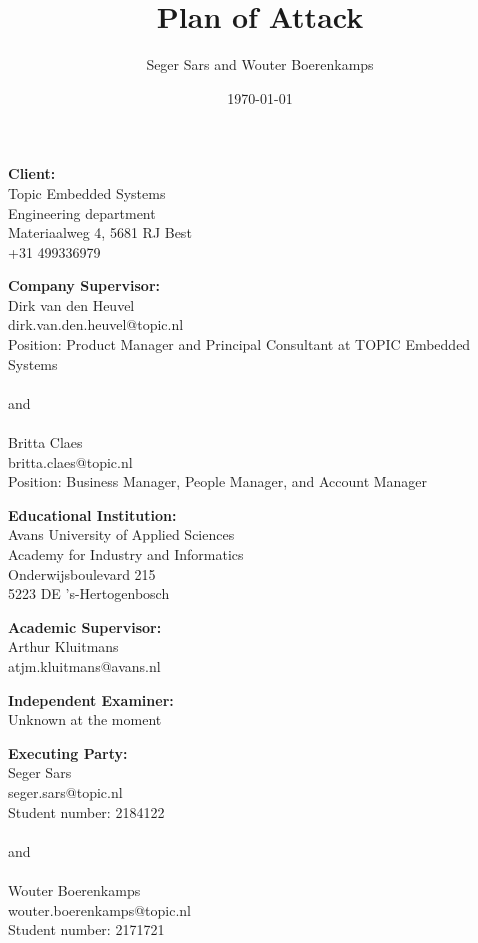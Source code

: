\documentclass{article}
\title{Plan of Attack}
\author{Seger Sars and Wouter Boerenkamps}
\date{\today}
\begin{document}
\maketitle

\newpage

\noindent \textbf{Client:}\\
Topic Embedded Systems\\
Engineering department\\
Materiaalweg 4, 5681 RJ Best\\
+31 499336979\\

\vspace{1em}

\noindent \textbf{Company Supervisor:}\\
Dirk van den Heuvel\\
dirk.van.den.heuvel@topic.nl\\
Position: Product Manager and Principal Consultant at TOPIC Embedded Systems\\
\\
and\\
\\
Britta Claes\\
britta.claes@topic.nl\\
Position: Business Manager, People Manager, and Account Manager

\vspace{1em}

\noindent \textbf{Educational Institution:}\\
Avans University of Applied Sciences\\
Academy for Industry and Informatics\\
Onderwijsboulevard 215\\
5223 DE 's-Hertogenbosch

\vspace{1em}

\noindent \textbf{Academic Supervisor:}\\
Arthur Kluitmans\\
atjm.kluitmans@avans.nl

\vspace{1em}

\noindent \textbf{Independent Examiner:}\\
Unknown at the moment

\vspace{1em}

\noindent \textbf{Executing Party:}\\
Seger Sars\\
seger.sars@topic.nl\\
Student number: 2184122\\
\\
and\\
\\
Wouter Boerenkamps\\
wouter.boerenkamps@topic.nl\\
Student number: 2171721
\end{document}
